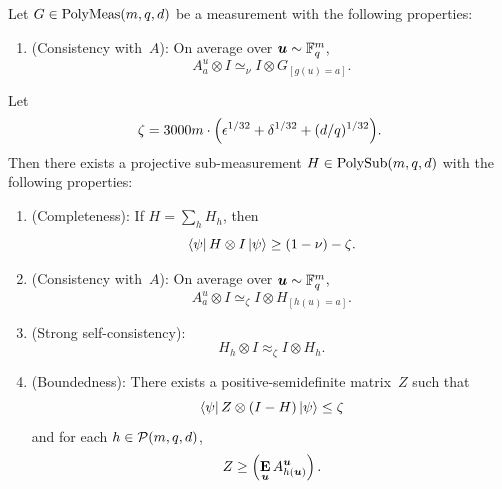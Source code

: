 \begin{theorem}\label{thm:self-improvement}
Let $G \in \mathrm{PolyMeas}(m, q, d)$ be a measurement with the following properties:
\begin{enumerate}

  \item (Consistency with~$A$): \label{item:self-improvement-projective-G-consistency} On average over $\boldsymbol{u} \sim \mathbb F_q^{m}$,
	  \begin{equation*}
	  A^{u}_a \otimes I \simeq_{\nu} I \otimes G_{[g(u)=a]}.
	  \end{equation*}
	  \end{enumerate}
Let
\begin{equation*}
\zeta = 3000m\cdot \Big(\epsilon^{1/32} + \delta^{1/32} + (d/q)^{1/32}\Big).
\end{equation*}
Then there exists a projective sub-measurement $H \in \mathrm{PolySub}(m, q, d)$ with the following properties:
\begin{enumerate}
    \item(Completeness):  \label{item:self-improvement-projective-completeness} If $H =  \sum_h H_h$, then
    \begin{equation*}
    \bra{\psi} H \otimes I \ket{\psi} \geq (1-\nu)-\zeta.
    \end{equation*}
    \item(Consistency with~$A$):\label{item:self-improvement-projective-A-consistency} On average over $\boldsymbol{u} \sim \mathbb F_q^m$,
        \begin{equation*}
            A^u_a \otimes I \simeq_{\zeta} I \otimes H_{[h(u) = a]}.
        \end{equation*}
    \item(Strong self-consistency): \label{item:self-improvement-projective-self}
    	\begin{equation*}
		H_h \otimes I \approx_{\zeta} I \otimes H_h.
	\end{equation*}
    \item(Boundedness): \label{item:self-improvement-projective-boundedness} There exists a positive-semidefinite matrix~$Z$ such that
    \begin{equation*}
        \bra{\psi} Z \otimes (I - H) \ket{\psi} \leq \zeta
    \end{equation*}
    and for each $h \in \mathcal{P}(m, q, d)$,
	\begin{equation*}
	Z \geq \left(\mathop{\bf E\/}_{\boldsymbol{u}} A^{\boldsymbol{u}}_{h(\boldsymbol{u})}\right).
	\end{equation*}
\end{enumerate}
\end{theorem}
